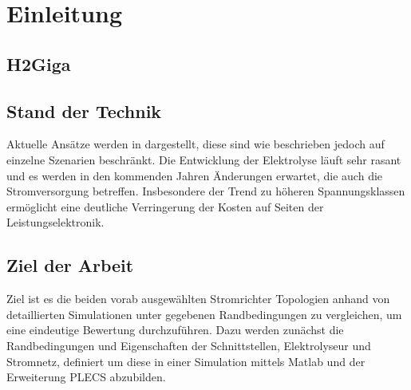 \chapter{Einleitung}


\section{H2Giga}




\section{Stand der Technik}
Aktuelle Ansätze werden in \cite{HydrogenRectifier} dargestellt, diese sind wie beschrieben jedoch auf einzelne Szenarien beschränkt. Die Entwicklung der Elektrolyse läuft sehr rasant und es werden in den kommenden Jahren Änderungen erwartet, die auch die Stromversorgung betreffen. Insbesondere der Trend zu höheren Spannungsklassen ermöglicht eine deutliche Verringerung der Kosten auf Seiten der Leistungselektronik.

\section{Ziel der Arbeit}
Ziel ist es die beiden vorab ausgewählten Stromrichter Topologien anhand von detaillierten Simulationen unter gegebenen Randbedingungen zu vergleichen, um eine eindeutige Bewertung durchzuführen. Dazu werden zunächst die Randbedingungen und Eigenschaften der Schnittstellen, Elektrolyseur und Stromnetz, definiert um diese in einer Simulation mittels Matlab und der Erweiterung PLECS abzubilden. 